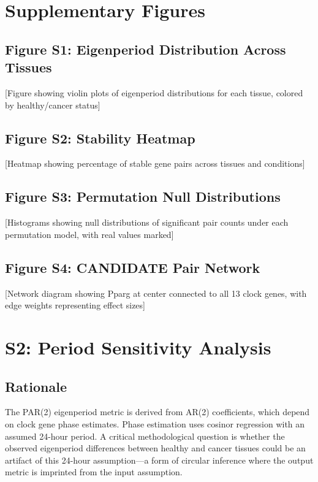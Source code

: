 \documentclass[11pt,a4paper]{article}
\begin{document}
\section{Supplementary Figures}

\subsection{Figure S1: Eigenperiod Distribution Across Tissues}

[Figure showing violin plots of eigenperiod distributions for each tissue, colored by healthy/cancer status]

\subsection{Figure S2: Stability Heatmap}

[Heatmap showing percentage of stable gene pairs across tissues and conditions]

\subsection{Figure S3: Permutation Null Distributions}

[Histograms showing null distributions of significant pair counts under each permutation model, with real values marked]

\subsection{Figure S4: CANDIDATE Pair Network}

[Network diagram showing Pparg at center connected to all 13 clock genes, with edge weights representing effect sizes]

\section{S2: Period Sensitivity Analysis}

\subsection{Rationale}

The PAR(2) eigenperiod metric is derived from AR(2) coefficients, which depend on clock gene phase estimates. Phase estimation uses cosinor regression with an assumed 24-hour period. A critical methodological question is whether the observed eigenperiod differences between healthy and cancer tissues could be an artifact of this 24-hour assumption---a form of circular inference where the output metric is imprinted from the input assumption.
\end{document}
